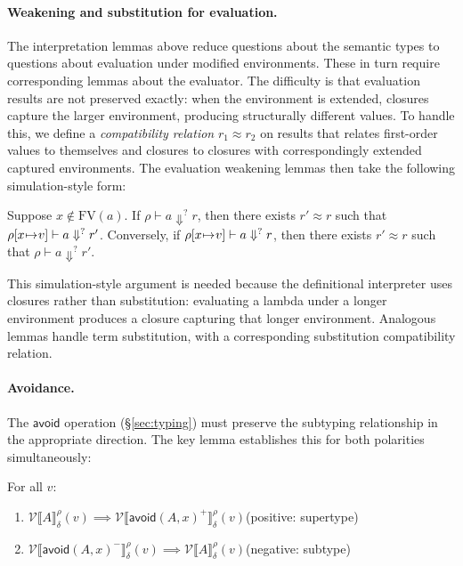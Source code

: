 \documentclass[acmsmall]{acmart}
\newcommand{\bind}{\mathchoice{\mathbin{\!\mapsto\!}}{\mathbin{\!\mapsto\!}}{\mapsto}{\mapsto}}
\begin{document}
\paragraph{Weakening and substitution for evaluation.}
The interpretation lemmas above reduce questions about the semantic types to questions about evaluation under modified environments. These in turn require corresponding lemmas about the evaluator. The difficulty is that evaluation results are not preserved exactly: when the environment is extended, closures capture the larger environment, producing structurally different values. To handle this, we define a \emph{compatibility relation} $r_1 \approx r_2$ on results that relates first-order values to themselves and closures to closures with correspondingly extended captured environments. The evaluation weakening lemmas then take the following simulation-style form:

\begin{lemma}\label{lem:eval-weaken}
  Suppose $x \notin \mathrm{FV}(a)$.
  If\/ $\rho \vdash a \Downarrow^? r$, then there exists $r' \approx r$ such that
  $\rho[x \bind v] \vdash a \Downarrow^? r'$.
  Conversely, if\/ $\rho[x \bind v] \vdash a \Downarrow^? r$, then there exists $r' \approx r$ such that $\rho \vdash a \Downarrow^? r'$.
\end{lemma}

\noindent This simulation-style argument is needed because the definitional interpreter uses closures rather than substitution: evaluating a lambda under a longer environment produces a closure capturing that longer environment. Analogous lemmas handle term substitution, with a corresponding substitution compatibility relation.

\paragraph{Avoidance.}
The $\textsf{avoid}$ operation (\S\ref{sec:typing}) must preserve the subtyping relationship in the appropriate direction. The key lemma establishes this for both polarities simultaneously:

\begin{lemma}\label{lem:avoid}
  For all $v$:
  \begin{enumerate}[nosep]
    \item $\mathcal{V}\llbracket A \rrbracket_{\delta}^{\rho}(v) \implies \mathcal{V}\llbracket \textsf{avoid}(A, x)^{+} \rrbracket_{\delta}^{\rho}(v)$\quad (positive: supertype)
    \item $\mathcal{V}\llbracket \textsf{avoid}(A, x)^{-} \rrbracket_{\delta}^{\rho}(v) \implies \mathcal{V}\llbracket A \rrbracket_{\delta}^{\rho}(v)$\quad (negative: subtype)
  \end{enumerate}
\end{lemma}
\end{document}
